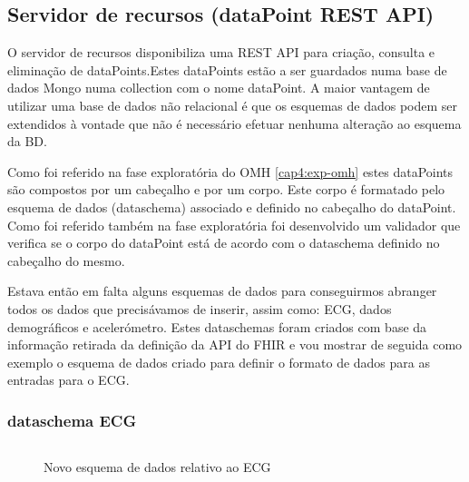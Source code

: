 \subsection{Servidor de recursos (dataPoint REST API) }
O servidor de recursos disponibiliza uma \gls{REST} \gls{API} para criação, consulta e eliminação de dataPoints.Estes dataPoints estão a ser guardados numa base de dados Mongo numa collection com o nome dataPoint. A maior vantagem de utilizar uma base de dados não relacional é que os esquemas de dados podem ser extendidos à vontade que não é necessário efetuar nenhuma alteração ao esquema da BD. \par 
Como foi referido na fase exploratória do \gls{OMH} \ref{cap4:exp-omh} estes dataPoints são compostos por um cabeçalho e por um corpo. Este corpo é formatado pelo esquema de dados (dataschema) associado e definido no cabeçalho do dataPoint. Como foi referido também na fase exploratória foi desenvolvido um validador que verifica se o corpo do dataPoint está de acordo com o dataschema definido no cabeçalho do mesmo. \par
Estava então em falta alguns esquemas de dados para conseguirmos abranger todos os dados que precisávamos de inserir, assim como: \gls{ECG}, dados demográficos e acelerómetro. Estes dataschemas foram criados com base da informação retirada da definição da \gls{API} do \gls{FHIR} e vou mostrar de seguida como exemplo o esquema de dados criado para definir o formato de dados para as entradas para o \gls{ECG}.
\subsubsection{dataschema ECG}
\begin{figure}[H]
\inputminted[fontsize=\scriptsize]{json}{code/ecg.json}
\caption[Novo esquema de dados relativo ao ECG]{Novo esquema de dados relativo ao ECG}
\label{f:ecgjsonschema}
\end{figure}


